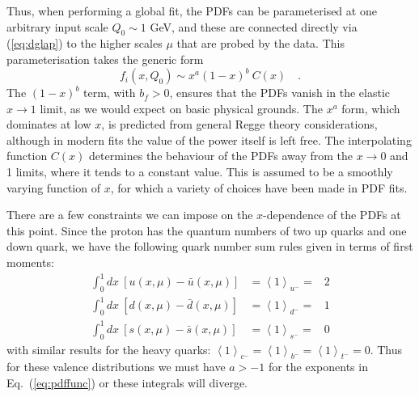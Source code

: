 Thus, when performing a global fit, the PDFs can be parameterised at one arbitrary input scale $Q_0\sim 1$ GeV, and these are connected directly via (\ref{eq:dglap}) to the higher scales $\mu$ that are probed by the data.
This parameterisation takes the generic form
\begin{equation}\label{eq:pdffunc}
f_{i}(x,Q_0)\sim x^{a}(1-x)^{b}\:C(x)\quad.
\end{equation}
The $(1-x)^b$ term, with $b_{f}>0$, ensures that the PDFs vanish in the elastic $x\to 1$ limit, as we would expect on basic physical grounds. 
The $x^a$ form, which dominates at low $x$, is predicted from general Regge theory considerations, although in modern fits the value of the power itself is left free. The interpolating function $C(x)$ determines the behaviour of the PDFs away from the $x\to 0$ and 1 limits, where it tends to a constant value. This is assumed to be a smoothly varying function of $x$, for which a variety of choices have been made in PDF fits.

There are a few constraints we
can impose on the $x$-dependence of the PDFs at this point. Since
the proton has the quantum numbers of two up quarks and one down quark,
we have the following quark number sum rules given in terms of first
moments: 
%
\begin{eqnarray}
\int_{0}^{1}dx\ \left[u(x,\mu)-\bar{u}(x,\mu)\right] & =\left\langle 1\right\rangle _{u^{-}}= & 2\\
\int_{0}^{1}dx\ \left[d(x,\mu)-\bar{d}(x,\mu)\right] & =\left\langle 1\right\rangle _{d^{-}}= & 1\\
\int_{0}^{1}dx\ \left[s(x,\mu)-\bar{s}(x,\mu)\right] & =\left\langle 1\right\rangle _{s^{-}}= & 0
\end{eqnarray}
with similar results for the heavy quarks: $\left\langle 1\right\rangle _{c^{-}}=\left\langle 1\right\rangle _{b^{-}}=\left\langle 1\right\rangle _{t^{-}}=0$. Thus for these valence distributions we must have $a>-1$ for the exponents in
Eq.~(\ref{eq:pdffunc}) or these integrals will diverge.

